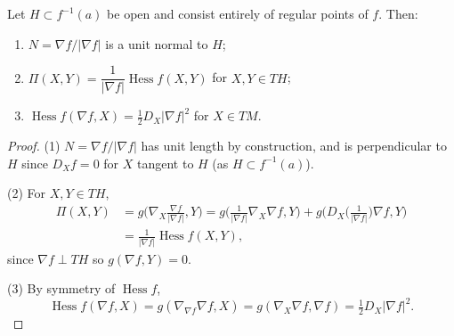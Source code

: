 \begin{proposition}[Proposition 3.2.1]
  \label{prop:pet-ch3-normal-hessian-relation}
  \leanok
  Let $H\subset f^{-1}(a)$ be open and consist entirely of regular points of $f$.
  Then:
  \begin{enumerate}
    \item[(1)] $N=\nabla f/|\nabla f|$ is a unit normal to $H$;
    \item[(2)] $\Pi(X,Y)=\dfrac1{|\nabla f|}\operatorname{Hess}f(X,Y)$ for
    $X,Y\in TH$;
    \item[(3)] $\operatorname{Hess}f(\nabla f,X)=\tfrac12D_X|\nabla f|^2$ for
    $X\in TM$.
  \end{enumerate}
\end{proposition}
\begin{proof}
  \leanok
  (1) $N=\nabla f/|\nabla f|$ has unit length by construction, and is
  perpendicular to $H$ since $D_Xf=0$ for $X$ tangent to $H$ (as $H\subset
  f^{-1}(a)$).

  (2) For $X,Y\in TH$,
  \begin{align*}
    \Pi(X,Y)&=g\Big(\nabla_X\frac{\nabla f}{|\nabla f|},Y\Big)
    =g\Big(\frac1{|\nabla f|}\nabla_X\nabla f,Y\Big)+g\Big(D_X\Big(\frac1{|\nabla
    f|}\Big)\nabla f,Y\Big)\\
    &=\frac1{|\nabla f|}\operatorname{Hess}f(X,Y),
  \end{align*}
  since $\nabla f\perp TH$ so $g(\nabla f,Y)=0$.

  (3) By symmetry of $\operatorname{Hess}f$,
  \[
    \operatorname{Hess}f(\nabla f,X)=g(\nabla_{\nabla f}\nabla f,X)
    =g(\nabla_X\nabla f,\nabla f)=\tfrac12D_X|\nabla f|^2.
  \]
\end{proof}

